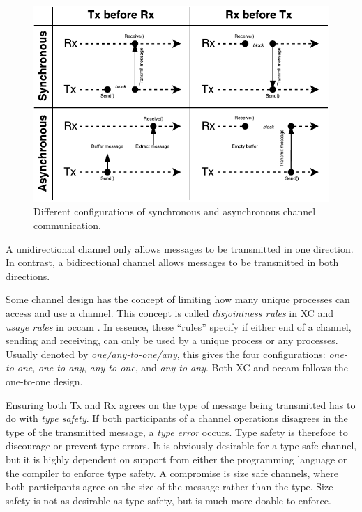 \begin{figure}[h!]
    \centering
    \includegraphics[width=0.9\linewidth]{fig/channel_sync_async}
    \caption{Different configurations of synchronous and asynchronous channel communication.}
    \label{fig:channel_sync_async}
\end{figure}

A unidirectional channel only allows messages to be transmitted in one direction. In contrast, a bidirectional channel allows messages to be transmitted in both directions.

Some channel design has the concept of limiting how many unique processes can access and use a channel. This concept is called \textit{disjointness rules} in XC \citep{douglas2009programming} and \textit{usage rules} in occam \citep{barrett1992occam}. In essence, these ``rules'' specify if either end of a channel, sending and receiving, can only be used by a unique process or any processes. Usually denoted by \textit{one/any\hyp{}to\hyp{}one/any}, this gives the four configurations: \textit{one\hyp{}to\hyp{}one}, \textit{one\hyp{}to\hyp{}any}, \textit{any\hyp{}to\hyp{}one}, and \textit{any\hyp{}to\hyp{}any}. Both XC and occam follows the one\hyp{}to\hyp{}one design.

Ensuring both Tx and Rx agrees on the type of message being transmitted has to do with \textit{type safety}. If both participants of a channel operations disagrees in the type of the transmitted message, a \textit{type error} occurs. Type safety is therefore to discourage or prevent type errors. It is obviously desirable for a type safe channel, but it is highly dependent on support from either the programming language or the compiler to enforce type safety. A compromise is size safe channels, where both participants agree on the size of the message rather than the type. Size safety is not as desirable as type safety, but is much more doable to enforce.


